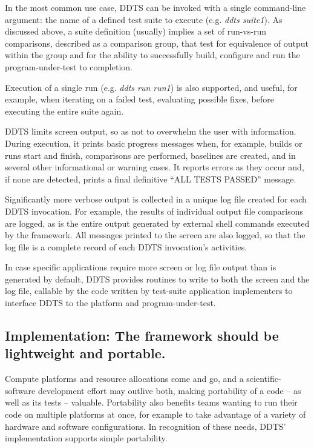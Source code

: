 \documentclass[conference]{IEEEtran}
\begin{document}
In the most common use case, DDTS can be invoked with a single command-line argument: the name of a defined test suite to execute (e.g. \emph{ddts suite1}). As discussed above, a suite definition (usually) implies a set of run-vs-run comparisons, described as a comparison group, that test for equivalence of output within the group and for the ability to successfully build, configure and run the program-under-test to completion.

Execution of a single run (e.g. \emph{ddts run run1}) is also supported, and useful, for example, when iterating on a failed test, evaluating possible fixes, before executing the entire suite again.

DDTS limits screen output, so as not to overwhelm the user with information. During execution, it prints basic progress messages when, for example, builds or runs start and finish, comparisons are performed, baselines are created, and in several other informational or warning cases. It reports errors as they occur and, if none are detected, prints a final definitive ``ALL TESTS PASSED'' message.

Significantly more verbose output is collected in a unique log file created for each DDTS invocation. For example, the results of individual output file comparisons are logged, as is the entire output generated by external shell commands executed by the framework. All messages printed to the screen are also logged, so that the log file is a complete record of each DDTS invocation's activities.

In case specific applications require more screen or log file output than is generated by default, DDTS provides routines to write to both the screen and the log file, callable by the code written by test-suite application implementers to interface DDTS to the platform and program-under-test.

\subsection{Implementation: The framework should be lightweight and portable.}

Compute platforms and resource allocations come and go, and a scientific-software development effort may outlive both, making portability of a code -- as well as its tests -- valuable. Portability also benefits teams wanting to run their code on multiple platforms at once, for example to take advantage of a variety of hardware and software configurations. In recognition of these needs, DDTS' implementation supports simple portability.
\end{document}

